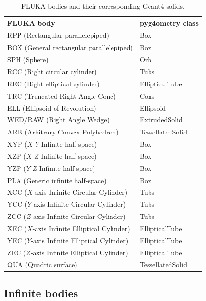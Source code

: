 \documentclass[final,5p,times,twocolumn]{elsarticle}
\begin{document}
\begin{table}[hbt!]
\caption{FLUKA bodies and their corresponding Geant4 solids.} \label{tab:Fluka2Geant4}
\centering
\begin{tabular}{ll} \hline
FLUKA body							& pyg4ometry class \\ \hline
RPP (Rectangular parallelepiped)			& Box \\
BOX (General rectangular parallelepiped)		& Box \\
SPH (Sphere)    						& Orb \\
RCC (Right circular cylinder)				& Tubs \\
REC (Right elliptical cylinder)				& EllipticalTube \\
TRC (Truncated Right Angle Cone)			& Cons \\
ELL (Ellipsoid of Revolution) 				& Ellipsoid \\
WED/RAW (Right Angle Wedge)		        	& ExtrudedSolid \\
ARB	(Arbitrary Convex Polyhedron)			& TessellatedSolid \\
XYP 	($X$-$Y$ Infinite half-space)			& Box \\
XZP 	($X$-$Z$ Infinite half-space)			& Box \\
YZP 	($Y$-$Z$ Infinite half-space)			& Box \\
PLA (Generic infinite half-space)			& Box \\
XCC ($X$-axis Infinite Circular Cylinder)		& Tubs \\
YCC ($Y$-axis Infinite Circular Cylinder)		& Tubs \\
ZCC 	($Z$-axis Infinite Circular Cylinder)		& Tubs \\
XEC 	($X$-axis Infinite Elliptical Cylinder)		& EllipticalTube \\
YEC 	($Y$-axis Infinite Elliptical Cylinder)		& EllipticalTube \\
ZEC ($Z$-axis Infinite Elliptical Cylinder)		& EllipticalTube \\
QUA (Quadric surface) 					& TessellatedSolid \\ \hline
\end{tabular}
\end{table}

\subsection{Infinite bodies}
\end{document}
